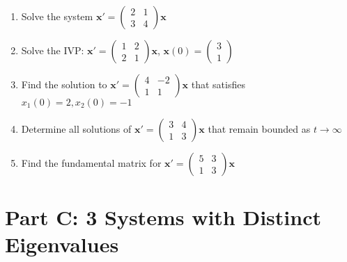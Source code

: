 \documentclass[12pt]{article}
\begin{document}
\begin{enumerate}[start=6]
\item Solve the system $\mathbf{x}' = \begin{pmatrix} 2 & 1 \\ 3 & 4 \end{pmatrix}\mathbf{x}$

\item Solve the IVP: $\mathbf{x}' = \begin{pmatrix} 1 & 2 \\ 2 & 1 \end{pmatrix}\mathbf{x}$, $\mathbf{x}(0) = \begin{pmatrix} 3 \\ 1 \end{pmatrix}$

\item Find the solution to $\mathbf{x}' = \begin{pmatrix} 4 & -2 \\ 1 & 1 \end{pmatrix}\mathbf{x}$ that satisfies $x_{1}(0) = 2, x_{2}(0) = -1$

\item Determine all solutions of $\mathbf{x}' = \begin{pmatrix} 3 & 4 \\ 1 & 3 \end{pmatrix}\mathbf{x}$ that remain bounded as $t \to \infty$

\item Find the fundamental matrix for $\mathbf{x}' = \begin{pmatrix} 5 & 3 \\ 1 & 3 \end{pmatrix}\mathbf{x}$
\end{enumerate}

\section*{Part C: 3 Systems with Distinct Eigenvalues}
\end{document}
